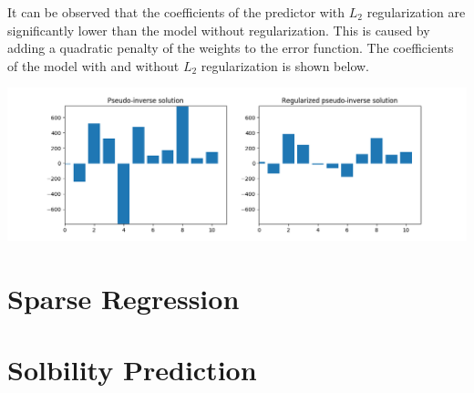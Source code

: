 \documentclass{article}
\begin{document}
It can be observed that the coefficients of the predictor with $L_2$ regularization are significantly lower than the model without regularization. This is caused by adding a quadratic penalty of the weights to the error function. The coefficients of the model with and without $L_2$ regularization is shown below.
\begin{center}
\includegraphics[scale=0.4]{reg_weights_compare}
\end{center}

\section{Sparse Regression}

\section{Solbility Prediction}
\end{document}

